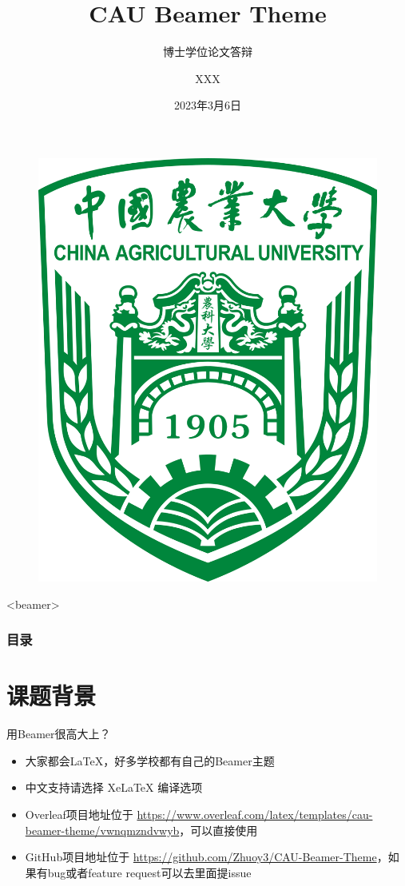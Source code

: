 \documentclass[aspectratio=43]{beamer} %
\author{XXX} %
\title{CAU Beamer Theme} %
\subtitle{博士学位论文答辩} %
\institute{中国农业大学动物科学技术学院} %
\date{2023年3月6日} %
\begin{document}

\kaishu%

\begin{frame} %
    \thispagestyle{empty}
    \titlepage%
    \begin{figure}[htpb] %
        \begin{center} %
            \includegraphics[width=0.2\linewidth]{pic/China_Agricultural_University_Logo.png} %
        \end{center}
    \end{figure}
\end{frame}

\begin{frame}<beamer> %
    \frametitle{\textbf{目录}}
    \tableofcontents[
        sectionstyle=show,
        subsectionstyle=show/shaded/hide,
        subsubsectionstyle=show/shaded/hide
    ] %
\end{frame}

\section{课题背景}
\begin{frame}{用Beamer很高大上？}
    \begin{itemize}[<+-| alert@+>] %
        \item 大家都会\LaTeX{}，好多学校都有自己的Beamer主题
        \item 中文支持请选择 Xe\LaTeX{} 编译选项
        \item Overleaf项目地址位于 \url{https://www.overleaf.com/latex/templates/cau-beamer-theme/vwnqmzndvwyb}，可以直接使用
        \item GitHub项目地址位于 \url{https://github.com/Zhuoy3/CAU-Beamer-Theme}，如果有bug或者feature request可以去里面提issue
    \end{itemize}
\end{frame}
\end{document}
